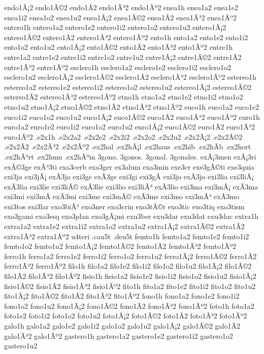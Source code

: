 {endo1Ã¡2 endo1Ã©2 endo1Ã­2 endo1Ã³2 endo1Ãº2
enea1h
enea1a2 enea1e2 enea1i2 enea1o2 enea1u2
enea1Ã¡2 enea1Ã©2 enea1Ã­2 enea1Ã³2 enea1Ãº2
entero1h
entero1a2 entero1e2 entero1i2 entero1o2 entero1u2
entero1Ã¡2 entero1Ã©2 entero1Ã­2 entero1Ã³2 entero1Ãº2
ento1h
ento1a2 ento1e2 ento1i2 ento1o2 ento1u2
ento1Ã¡2 ento1Ã©2 ento1Ã­2 ento1Ã³2 ento1Ãº2
entre1h
entre1a2 entre1e2 entre1i2 entre1o2 entre1u2
entre1Ã¡2 entre1Ã©2 entre1Ã­2 entre1Ã³2 entre1Ãº2
esclero1h
esclero1a2 esclero1e2 esclero1i2 esclero1o2 esclero1u2
esclero1Ã¡2 esclero1Ã©2 esclero1Ã­2 esclero1Ã³2 esclero1Ãº2
estereo1h
estereo1a2 estereo1e2 estereo1i2 estereo1o2 estereo1u2
estereo1Ã¡2 estereo1Ã©2 estereo1Ã­2 estereo1Ã³2 estereo1Ãº2
etno1h
etno1a2 etno1e2 etno1i2 etno1o2 etno1u2
etno1Ã¡2 etno1Ã©2 etno1Ã­2 etno1Ã³2 etno1Ãº2
euco1h
euco1a2 euco1e2 euco1i2 euco1o2 euco1u2
euco1Ã¡2 euco1Ã©2 euco1Ã­2 euco1Ã³2 euco1Ãº2
euro1h
euro1a2 euro1e2 euro1i2 euro1o2 euro1u2
euro1Ã¡2 euro1Ã©2 euro1Ã­2 euro1Ã³2 euro1Ãº2
.e2x1h
.e2x2a2 .e2x2e2 .e2x2i2 .e2x2o2 .e2x2u2
.e2x2Ã¡2 .e2x2Ã©2 .e2x2Ã­2 .e2x2Ã³2 .e2x2Ãº2
.ex2hal
.ex2hÃ¡l
.ex2haus
.ex2hib
.ex2hÃ­b
.ex2hort
.ex2hÃ³rt
.ex2hum
.ex2hÃºm
3gono.
3gonos.
3gonal.
3gonales.
exÃ¡3men
exÃ¡3ri
exÃ©3ge
exÃ³3ti
exa3cerb
exa3ger
ex3alum
exa3min
exe3cr
exe3gÃ©ti
exe3quia
exi3ja
exi3jÃ¡
exÃ­3ja
exi3ge
exÃ­3ge
exi3gi
exi3gÃ­
exi3jo
exÃ­3jo
exi3lia
exi3liÃ¡
exÃ­3lia
exi3lie
exi3liÃ©
exÃ­3lie
exi3lio
exi3liÃ³
exÃ­3lio
exi3ma
exi3mÃ¡
exÃ­3ma
exi3mi
exi3mÃ­
exÃ­3mi
exi3me
exi3mÃ©
exÃ­3me
exi3mo
exi3mÃ³
exÃ­3mo
exi3tos
exi3lar
exo3biÃ³
exo3ner
exo3crin
exo3tÃ©r
exo3tic
exo3tiq
exo3tism
exo3gami
exo3esq
exo3plan
exo3gÃ¡mi
exu3ber
exu3dar
exu3dat
exu3dac
extra1h
extra1a2 extra1e2 extra1i2 extra1o2 extra1u2
extra1Ã¡2 extra1Ã©2 extra1Ã­2 extra1Ã³2 extra1Ãº2
u4teri
.cau5t
.deu5t
femto1h
femto1a2 femto1e2 femto1i2 femto1o2 femto1u2
femto1Ã¡2 femto1Ã©2 femto1Ã­2 femto1Ã³2 femto1Ãº2
ferro1h
ferro1a2 ferro1e2 ferro1i2 ferro1o2 ferro1u2
ferro1Ã¡2 ferro1Ã©2 ferro1Ã­2 ferro1Ã³2 ferro1Ãº2
filo1h
filo1a2 filo1e2 filo1i2 filo1o2 filo1u2
filo1Ã¡2 filo1Ã©2 filo1Ã­2 filo1Ã³2 filo1Ãº2
fisio1h
fisio1a2 fisio1e2 fisio1i2 fisio1o2 fisio1u2
fisio1Ã¡2 fisio1Ã©2 fisio1Ã­2 fisio1Ã³2 fisio1Ãº2
fito1h
fito1a2 fito1e2 fito1i2 fito1o2 fito1u2
fito1Ã¡2 fito1Ã©2 fito1Ã­2 fito1Ã³2 fito1Ãº2
fono1h
fono1a2 fono1e2 fono1i2 fono1o2 fono1u2
fono1Ã¡2 fono1Ã©2 fono1Ã­2 fono1Ã³2 fono1Ãº2
foto1h
foto1a2 foto1e2 foto1i2 foto1o2 foto1u2
foto1Ã¡2 foto1Ã©2 foto1Ã­2 foto1Ã³2 foto1Ãº2
galo1h
galo1a2 galo1e2 galo1i2 galo1o2 galo1u2
galo1Ã¡2 galo1Ã©2 galo1Ã­2 galo1Ã³2 galo1Ãº2
gastero1h
gastero1a2 gastero1e2 gastero1i2 gastero1o2 gastero1u2
}
